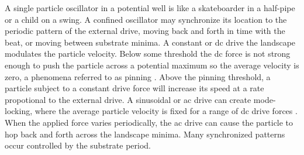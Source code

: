 \documentclass[twocolumn,preprintnumbers,amsmath,amssymb,aps,prx]{revtex4}
\begin{document}
A single particle oscillator
in a potential well is 
like a skateboarder in a half-pipe or
a child on a swing.
 A confined oscillator may 
 synchronize its location
 to the periodic pattern of the external drive,
 moving back and forth in time with
 the beat,
 or moving between substrate minima.
 A constant or 
 dc drive the landscape modulates 
 the particle velocity.
 Below some threshold  
 the dc force is not strong enough to push the particle
 across a potential maximum so the average velocity is zero,
 a phenomena referred to as pinning \cite{Reichhardt2017}.
 Above the pinning threshold,
 a particle subject to a constant
 drive force will increase its speed at a rate propotional
 to the external drive.  
 A sinusoidal or ac drive can create mode-locking,
 where the average particle velocity
 is fixed for a range of dc drive forces \cite{Reichhardt2015}.
 When the applied force varies periodically,
 the ac drive can 
 cause the particle to hop back and forth across
 the landscape minima.
 Many synchronized patterns occur
 controlled by the substrate period.

 
\end{document}
